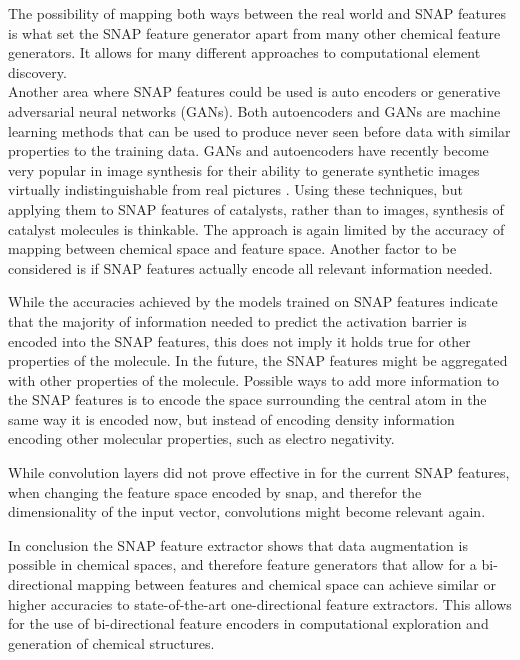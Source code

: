 The possibility of mapping both ways between the real world and SNAP features is what set the SNAP feature generator apart 
from many other chemical feature generators.
It allows for many different approaches to computational element discovery.
\\
Another area where SNAP features could be used is auto encoders or generative adversarial neural networks (GANs).
Both autoencoders and GANs are machine learning methods that can be used to produce never seen before data with similar properties
to the training data.
GANs and autoencoders have recently become very popular in image synthesis for their ability to generate synthetic images 
virtually indistinguishable from real pictures \cite{karras2019stylebased} .
Using these techniques, but applying them to SNAP features of catalysts, rather than to images, synthesis 
of catalyst molecules is thinkable.
The approach is again limited by the accuracy of mapping between chemical space and feature space.
Another factor to be considered is if SNAP features actually encode all relevant information needed.

While the accuracies achieved by the models trained on SNAP features indicate that 
the majority of information needed to predict the activation barrier is encoded into the SNAP features, this does
not imply it holds true for other properties of the molecule.
In the future, the SNAP features might be aggregated with other properties of the molecule.
Possible ways to add more information to the SNAP features is to encode the space surrounding the 
central atom in the same way it is encoded now, but instead of encoding density information encoding 
other molecular properties, such as electro negativity.

While convolution layers did not prove effective in for the current SNAP features,
when changing the feature space encoded by snap, and therefor the dimensionality of the input vector,
convolutions might become relevant again.

In conclusion the SNAP feature extractor shows that data augmentation is possible in chemical spaces, and therefore 
feature generators that allow for a bi-directional mapping between features and chemical space can achieve similar or higher
accuracies to state-of-the-art one-directional feature extractors.
This allows for the use of bi-directional feature encoders in computational exploration and generation of chemical structures.
